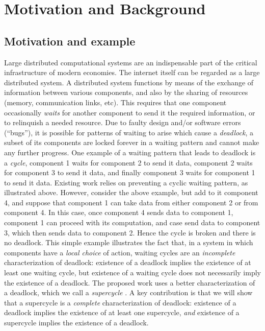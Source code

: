 \section{Motivation and Background}

\subsection{Motivation and example}

Large distributed computational systems are an indispensable part of the
critical infrastructure of modern economies. The internet itself can be regarded
as a large distributed system.  A distributed system functions by means of the
exchange of information between various components, and also by the sharing of
resources (\eg memory, communication links, etc). This requires that one
component occasionally \emph{waits} for another component to send it the required
information, or to relinquish a needed resource.  Due to faulty design and/or
software errors (``bugs''), it is possible for patterns of waiting to arise
which cause a {\em deadlock}, \ie a subset of its components are locked forever
in a waiting pattern and cannot make any further progress.
%
One example of a waiting pattern that leads to deadlock is a \emph{cycle}, \eg component 1 waits for component 2 to send it data, 
component 2 waits for component 3 to send it data, and finally 
component 3 waits for component 1 to send it data.
%
Existing work relies on preventing a cyclic waiting pattern, as illustrated above. However, consider the above example, but add to it component 4,
and suppose that component 1 can take data from either component 2 or from component 4. In this case, once component 4 sends data to component 1,
component 1 can proceed with its computation, and case send data to component 3, which then sends data to component 2. Hence the cycle is broken and
there is no deadlock.
%
This simple example illustrates the fact that, in a system in which components have a \emph{local choice} of action, waiting cycles are an
\emph{incomplete} characterization of deadlock: existence of a deadlock implies the existence of at least one waiting cycle, but existence of a
waiting cycle does not necessarily imply the existence of a deadlock.
%
The proposed work uses a better characterization of a deadlock, which we call a \emph{supercycle} \cite{FORTE13}. 
A key contribution is that we will show that a supercycle is a 
\emph{complete} characterization of deadlock: existence of a deadlock implies the existence of at least one supercycle, \emph{and} existence of a
supercycle implies the existence of a deadlock.

